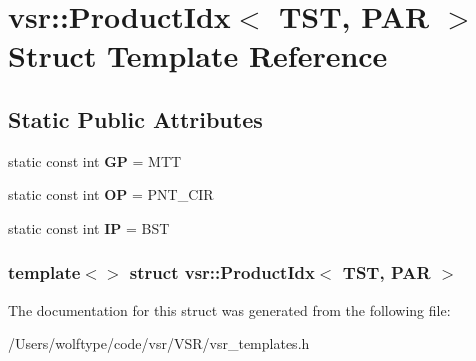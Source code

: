 \hypertarget{structvsr_1_1_product_idx_3_01_t_s_t_00_01_p_a_r_01_4}{\section{vsr\-:\-:Product\-Idx$<$ T\-S\-T, P\-A\-R $>$ Struct Template Reference}
\label{structvsr_1_1_product_idx_3_01_t_s_t_00_01_p_a_r_01_4}
}
\subsection*{Static Public Attributes}
\begin{DoxyCompactItemize}
\item 
\hypertarget{structvsr_1_1_product_idx_3_01_t_s_t_00_01_p_a_r_01_4_af8ae4b4644062b3e61f577212505c7fa}{static const int {\bfseries G\-P} = M\-T\-T}\label{structvsr_1_1_product_idx_3_01_t_s_t_00_01_p_a_r_01_4_af8ae4b4644062b3e61f577212505c7fa}

\item 
\hypertarget{structvsr_1_1_product_idx_3_01_t_s_t_00_01_p_a_r_01_4_a4c7a917b0572d84f4df1563d576f96b3}{static const int {\bfseries O\-P} = P\-N\-T\-\_\-\-C\-I\-R}\label{structvsr_1_1_product_idx_3_01_t_s_t_00_01_p_a_r_01_4_a4c7a917b0572d84f4df1563d576f96b3}

\item 
\hypertarget{structvsr_1_1_product_idx_3_01_t_s_t_00_01_p_a_r_01_4_aa9861400dd665117166d5323e96883c0}{static const int {\bfseries I\-P} = B\-S\-T}\label{structvsr_1_1_product_idx_3_01_t_s_t_00_01_p_a_r_01_4_aa9861400dd665117166d5323e96883c0}

\end{DoxyCompactItemize}
\subsubsection*{template$<$$>$ struct vsr\-::\-Product\-Idx$<$ T\-S\-T, P\-A\-R $>$}



The documentation for this struct was generated from the following file\-:\begin{DoxyCompactItemize}
\item 
/\-Users/wolftype/code/vsr/\-V\-S\-R/vsr\-\_\-templates.\-h\end{DoxyCompactItemize}
